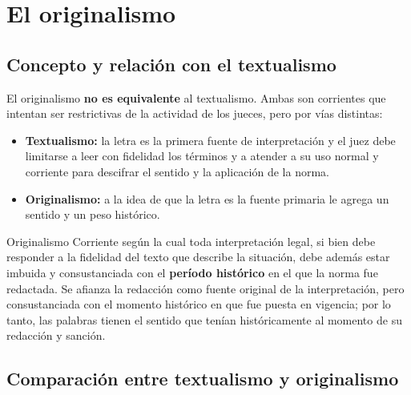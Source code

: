 \documentclass[12pt,oneside]{book}
\begin{document}
\section{El originalismo}

\subsection{Concepto y relación con el textualismo}

El originalismo \textbf{no es equivalente} al textualismo. Ambas son corrientes que intentan ser restrictivas de la actividad de los jueces, pero por vías distintas:

\begin{itemize}
    \item \textbf{Textualismo:} la letra es la primera fuente de interpretación y el juez debe limitarse a leer con fidelidad los términos y a atender a su uso normal y corriente para descifrar el sentido y la aplicación de la norma.
    \item \textbf{Originalismo:} a la idea de que la letra es la fuente primaria le agrega un sentido y un peso histórico.
\end{itemize}

\begin{definition}{Originalismo}
Corriente según la cual toda interpretación legal, si bien debe responder a la fidelidad del texto que describe la situación, debe además estar imbuida y consustanciada con el \textbf{período histórico} en el que la norma fue redactada. Se afianza la redacción como fuente original de la interpretación, pero consustanciada con el momento histórico en que fue puesta en vigencia; por lo tanto, las palabras tienen el sentido que tenían históricamente al momento de su redacción y sanción.
\end{definition}

\subsection{Comparación entre textualismo y originalismo}
\end{document}
